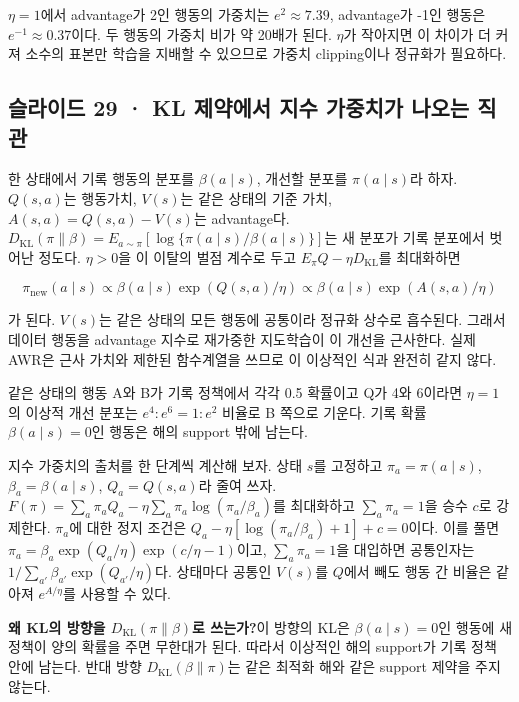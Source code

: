 \documentclass[11pt,a4paper]{article}
\begin{document}
$\eta=1$에서 advantage가 2인 행동의 가중치는 $e^2\approx7.39$, advantage가 -1인 행동은 $e^{-1}\approx0.37$이다. 두 행동의 가중치 비가 약 20배가 된다. $\eta$가 작아지면 이 차이가 더 커져 소수의 표본만 학습을 지배할 수 있으므로 가중치 clipping이나 정규화가 필요하다.\par

\subsection{슬라이드 29 · KL 제약에서 지수 가중치가 나오는 직관}

한 상태에서 기록 행동의 분포를 $\beta(a\mid s)$, 개선할 분포를 $\pi(a\mid s)$라 하자. $Q(s,a)$는 행동가치, $V(s)$는 같은 상태의 기준 가치, $A(s,a)=Q(s,a)-V(s)$는 advantage다. $D_{\mathrm{KL}}(\pi\|\beta)=E_{a\sim\pi}[\log\{\pi(a\mid s)/\beta(a\mid s)\}]$는 새 분포가 기록 분포에서 벗어난 정도다. $\eta>0$을 이 이탈의 벌점 계수로 두고 $E_\pi Q-\eta D_{\mathrm{KL}}$를 최대화하면\par

\[
\pi_{\mathrm{new}}(a\mid s)\propto
\beta(a\mid s)\exp(Q(s,a)/\eta)
\propto \beta(a\mid s)\exp(A(s,a)/\eta)
\]

가 된다. $V(s)$는 같은 상태의 모든 행동에 공통이라 정규화 상수로 흡수된다. 그래서 데이터 행동을 advantage 지수로 재가중한 지도학습이 이 개선을 근사한다. 실제 AWR은 근사 가치와 제한된 함수계열을 쓰므로 이 이상적인 식과 완전히 같지 않다.\par

같은 상태의 행동 A와 B가 기록 정책에서 각각 0.5 확률이고 Q가 4와 6이라면 $\eta=1$의 이상적 개선 분포는 $e^4:e^6=1:e^2$ 비율로 B 쪽으로 기운다. 기록 확률 $\beta(a\mid s)=0$인 행동은 해의 support 밖에 남는다.\par

지수 가중치의 출처를 한 단계씩 계산해 보자. 상태 $s$를 고정하고 $\pi_a=\pi(a\mid s)$, $\beta_a=\beta(a\mid s)$, $Q_a=Q(s,a)$라 줄여 쓰자. $F(\pi)=\sum_a\pi_aQ_a-\eta\sum_a\pi_a\log(\pi_a/\beta_a)$를 최대화하고 $\sum_a\pi_a=1$을 승수 $c$로 강제한다. $\pi_a$에 대한 정지 조건은 $Q_a-\eta[\log(\pi_a/\beta_a)+1]+c=0$이다. 이를 풀면 $\pi_a=\beta_a\exp(Q_a/\eta)\exp(c/\eta-1)$이고, $\sum_a\pi_a=1$을 대입하면 공통인자는 $1/\sum_{a'} \beta_{a'}\exp(Q_{a'}/\eta)$다. 상태마다 공통인 $V(s)$를 $Q$에서 빼도 행동 간 비율은 같아져 $e^{A/\eta}$를 사용할 수 있다.\par

\par\medskip\noindent\textbf{왜 KL의 방향을 $D_{\mathrm{KL}}(\pi\|\beta)$로 쓰는가?}\quad 이 방향의 KL은 $\beta(a\mid s)=0$인 행동에 새 정책이 양의 확률을 주면 무한대가 된다. 따라서 이상적인 해의 support가 기록 정책 안에 남는다. 반대 방향 $D_{\mathrm{KL}}(\beta\|\pi)$는 같은 최적화 해와 같은 support 제약을 주지 않는다.\par
\end{document}
